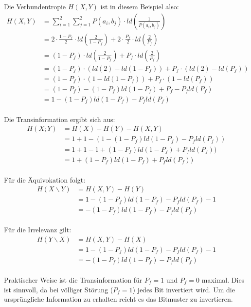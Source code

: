 Die Verbundentropie $H(X,Y)$ ist in diesem Beispiel also:
\begin{align*}
	H(X,Y) &= \sum_{i=1}^2\sum_{j=1}^2
		P(a_i,b_j) \cdot ld \left( 
		\frac{1}{P(a_i,b_j)} \right) \\
		   &= 2 \cdot \frac{1-P_f}{2} 
		\cdot ld \left( 
		\frac{2}{1-P_f} \right) 
		+ 2 \cdot \frac{P_f}{2} 
		\cdot ld \left( 
		\frac{2}{P_f} \right)\\
		   &= (1-P_f) \cdot ld \left( 
		\frac{2}{1-P_f} \right) 
		+ P_f	\cdot ld \left( 
		\frac{2}{P_f} \right)\\
		   &= (1-P_f) \cdot (ld(2) - ld(1-P_f)) 
		+ P_f	\cdot (ld(2) - ld(P_f))\\
		   &= (1-P_f) \cdot (1 - ld(1-P_f)) 
		+ P_f	\cdot (1 - ld(P_f))\\
		   &= (1 - P_f) - (1 - P_f)ld(1-P_f) 
		+ P_f - P_fld(P_f)\\
		   &= 1 - (1 - P_f)ld(1-P_f) - P_fld(P_f)\\
\end{align*}

Die Transinformation ergibt sich aus:
\begin{align*}
	H(X;Y) &= H(X) + H(Y) - H(X,Y) \\
	       &= 1 + 1 - (1 - (1 - P_f)
	       ld(1-P_f) - P_fld(P_f))\\
	       &= 1 + 1 - 1 + (1 - P_f)
	       ld(1-P_f) + P_fld(P_f))\\
	       &= 1 + (1 - P_f)
	       ld(1-P_f) + P_fld(P_f))\\
\end{align*}

Für die Äquivokation folgt:
\begin{align*}
	H(X \backslash Y) &= H(X, Y) - H(Y) \\
	&= 1 - (1 - P_f)ld(1-P_f) 
	- P_fld(P_f) - 1\\
	&= -(1 - P_f)ld(1-P_f) - P_fld(P_f) \\
\end{align*}

Für die Irrelevanz gilt:
\begin{align*}
	H(Y \backslash X) &= H(X, Y) - H(X) \\
	&= 1 - (1 - P_f)ld(1-P_f) 
	- P_fld(P_f) - 1\\
	&= -(1 - P_f)ld(1-P_f) - P_fld(P_f) \\
\end{align*}

Praktischer Weise ist die Transinformation für $P_f = 1$ und $P_f = 0$ maximal. Dies ist sinnvoll, da bei völliger Störung ($P_f = 1$) jedes Bit invertiert wird. Um die ursprüngliche Information zu erhalten reicht es das Bitmuster zu invertieren.


